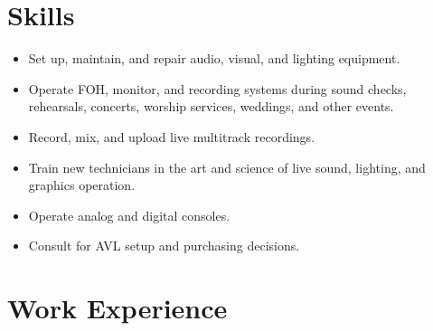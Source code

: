 \documentclass[12pt,sans,colorlinks,linkcolor=true]{moderncv}        %
\begin{document}
\hypersetup{urlcolor=links}
\makecvtitle
\section{Skills}

\begin{itemize}
\item Set up, maintain, and repair audio, visual, and lighting equipment.
\item Operate FOH, monitor, and recording systems during sound checks, rehearsals, concerts, worship services, weddings, and other events.
\item Record, mix, and upload live multitrack recordings.
\item Train new technicians in the art and science of live sound, lighting, and graphics operation.
\item Operate analog and digital consoles.
\item Consult for AVL setup and purchasing decisions.
\end{itemize}
\section{Work Experience}
\end{document}
